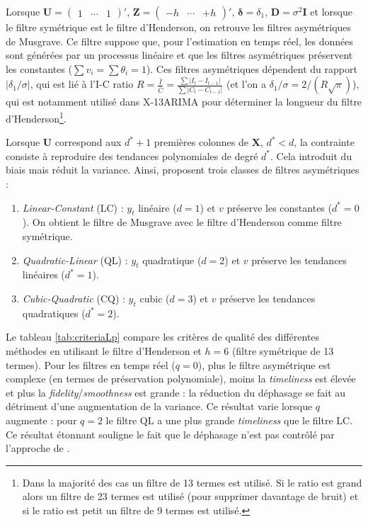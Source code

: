 \documentclass[
  12pt,
  a4paper,french]{article}
\newcommand\1{\mathds{1}}
\begin{document}
Lorsque \(\boldsymbol U=\begin{pmatrix}1&\cdots&1\end{pmatrix}'\), \(\boldsymbol Z=\begin{pmatrix}-h&\cdots&+h\end{pmatrix}'\), \(\boldsymbol \delta=\delta_1\), \(\boldsymbol D=\sigma^2\boldsymbol I\) et lorsque le filtre symétrique est le filtre d'Henderson, on retrouve les filtres asymétriques de Musgrave.
Ce filtre suppose que, pour l'estimation en temps réel, les données sont générées par un processus linéaire et que les filtres asymétriques préservent les constantes (\(\sum v_i=\sum \theta_i=1\)).
Ces filtres asymétriques dépendent du rapport \(\lvert\delta_1/\sigma\rvert\), qui est lié à l'I-C ratio \(R=\frac{\bar{I}}{\bar{C}}=\frac{\sum\lvert I_t-I_{t-1}\rvert}{\sum\lvert C_t-C_{t-1}\rvert}\) (et l'on a \(\delta_1/\sigma=2/(R\sqrt{\pi})\)), qui est notamment utilisé dans X-13ARIMA pour déterminer la longueur du filtre d'Henderson\footnote{
  Dans la majorité des cas un filtre de 13 termes est utilisé.
  Si le ratio est grand alors un filtre de 23 termes est utilisé (pour supprimer davantage de bruit) et si le ratio est petit un filtre de 9 termes est utilisé.}.

Lorsque \(\boldsymbol U\) correspond aux \(d^*+1\) premières colonnes de \(\boldsymbol X\), \(d^*<d\), la contrainte consiste à reproduire des tendances polynomiales de degré \(d^*\).
Cela introduit du biais mais réduit la variance.
Ainsi, \textcite{proietti2008} proposent trois classes de filtres asymétriques :

\begin{enumerate}
\def\labelenumi{\arabic{enumi}.}
\item
  \emph{Linear-Constant} (LC) : \(y_t\) linéaire (\(d=1\)) et \(v\) préserve les constantes (\(d^*=0\)).
  On obtient le filtre de Musgrave avec le filtre d'Henderson comme filtre symétrique.
\item
  \emph{Quadratic-Linear} (QL) : \(y_t\) quadratique (\(d=2\)) et \(v\) préserve les tendances linéaires (\(d^*=1\)).
\item
  \emph{Cubic-Quadratic} (CQ) : \(y_t\) cubic (\(d=3\)) et \(v\) préserve les tendances quadratiques (\(d^*=2\)).
\end{enumerate}

Le tableau \ref{tab:criteriaLp} compare les critères de qualité des différentes méthodes en utilisant le filtre d'Henderson et \(h=6\) (filtre symétrique de 13 termes).
Pour les filtres en temps réel (\(q=0\)), plus le filtre asymétrique est complexe (en termes de préservation polynomiale), moins la \emph{timeliness} est élevée et plus la \emph{fidelity}/\emph{smoothness} est grande : la réduction du déphasage se fait au détriment d'une augmentation de la variance.
Ce résultat varie lorsque \(q\) augmente : pour \(q=2\) le filtre QL a une plus grande \emph{timeliness} que le filtre LC.
Ce résultat étonnant souligne le fait que le déphasage n'est pas contrôlé par l'approche de \textcite{proietti2008}.
\end{document}
